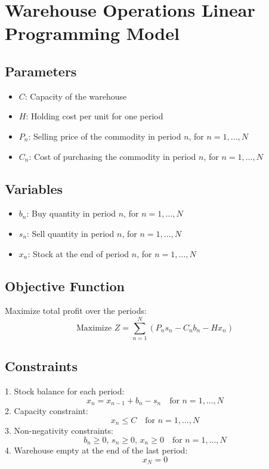 \documentclass{article}
\begin{document}
\section*{Warehouse Operations Linear Programming Model}

\subsection*{Parameters}
\begin{itemize}
    \item $C$: Capacity of the warehouse
    \item $H$: Holding cost per unit for one period
    \item $P_n$: Selling price of the commodity in period $n$, for $n = 1, \ldots, N$
    \item $C_n$: Cost of purchasing the commodity in period $n$, for $n = 1, \ldots, N$
\end{itemize}

\subsection*{Variables}
\begin{itemize}
    \item $b_n$: Buy quantity in period $n$, for $n = 1, \ldots, N$
    \item $s_n$: Sell quantity in period $n$, for $n = 1, \ldots, N$
    \item $x_n$: Stock at the end of period $n$, for $n = 1, \ldots, N$
\end{itemize}

\subsection*{Objective Function}
Maximize total profit over the periods:
\[
\text{Maximize } Z = \sum_{n=1}^{N} \left( P_n s_n - C_n b_n - H x_n \right)
\]

\subsection*{Constraints}
1. Stock balance for each period:
\[
x_n = x_{n-1} + b_n - s_n \quad \text{for } n = 1, \ldots, N
\]
2. Capacity constraint:
\[
x_n \leq C \quad \text{for } n = 1, \ldots, N
\]
3. Non-negativity constraints:
\[
b_n \geq 0, \, s_n \geq 0, \, x_n \geq 0 \quad \text{for } n = 1, \ldots, N
\]
4. Warehouse empty at the end of the last period:
\[
x_N = 0
\]
\end{document}
